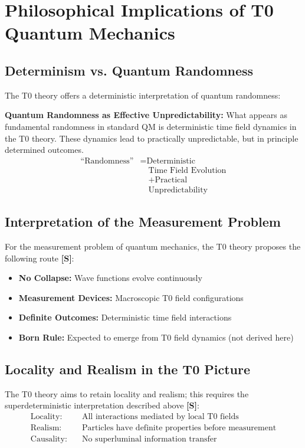 	\section{Philosophical Implications of T0 Quantum Mechanics}
	\subsection{Determinism vs. Quantum Randomness}
	The T0 theory offers a deterministic interpretation of quantum randomness:
	\begin{tcolorbox}[colback=purple!5!white,colframe=purple!75!black,title={T0 Determinism},breakable,width=\textwidth]
		\textbf{Quantum Randomness as Effective Unpredictability:}
		What appears as fundamental randomness in standard QM is deterministic time field dynamics in the T0 theory.
		These dynamics lead to practically unpredictable, but in principle determined outcomes.
		\begin{equation}
			\begin{split}
				\text{``Randomness''} &= \text{Deterministic} \\
				&\quad \text{Time Field Evolution} \\
				&\quad + \text{Practical} \\
				&\quad \text{Unpredictability}
			\end{split}
		\end{equation}
	\end{tcolorbox}
	\subsection{Interpretation of the Measurement Problem}
	For the measurement problem of quantum mechanics, the T0 theory proposes the following route \textbf{[S]}:
	\begin{itemize}
		\item \textbf{No Collapse:} Wave functions evolve continuously
		\item \textbf{Measurement Devices:} Macroscopic T0 field configurations
		\item \textbf{Definite Outcomes:} Deterministic time field interactions
		\item \textbf{Born Rule:} Expected to emerge from T0 field dynamics (not derived here)
	\end{itemize}
	\subsection{Locality and Realism in the T0 Picture}
	The T0 theory aims to retain locality and realism; this requires the superdeterministic interpretation described above \textbf{[S]}:
	\begin{align}
		\text{Locality:} &\quad \text{All interactions mediated by local T0 fields} \\
		\text{Realism:} &\quad \text{Particles have definite properties before measurement} \\
		\text{Causality:} &\quad \text{No superluminal information transfer}
	\end{align}
